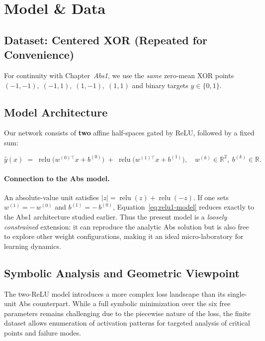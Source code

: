 \section{Model \& Data}
\label{sec:relu1-model-data}

\subsection*{Dataset: Centered XOR (Repeated for Convenience)}
For continuity with Chapter~\textit{Abs1}, we use the \emph{same} zero-mean XOR points \(({-}1,{-}1),\;({-}1,1),\;(1,{-}1),\;(1,1)\) and binary targets \(y\in\{0,1\}\).

\subsection*{Model Architecture}
Our network consists of \textbf{two} affine half-spaces gated by ReLU, followed by a fixed sum:

\begin{equation}
    \hat y(x)
    \;=\;
    \operatorname{relu}\!\bigl(w^{(0)\!\top}x + b^{(0)}\bigr)
    \;+\;
    \operatorname{relu}\!\bigl(w^{(1)\!\top}x + b^{(1)}\bigr),
    \quad
    w^{(k)}\!\in\mathbb{R}^{2},\;
    b^{(k)}\!\in\mathbb{R}.
    \label{eq:relu1-model}
\end{equation}

\paragraph{Connection to the Abs model.}
An absolute-value unit satisfies \(|z|=\operatorname{relu}(z)+\operatorname{relu}(-z).\) If one sets \(w^{(1)}=-\,w^{(0)}\) and \(b^{(1)}=-\,b^{(0)}\), Equation~\eqref{eq:relu1-model} reduces exactly to the Abs1 architecture studied earlier. Thus the present model is a \emph{loosely constrained} extension: it can reproduce the analytic Abs solution but is also free to explore other weight configurations, making it an ideal micro-laboratory for learning dynamics.

\subsection*{Symbolic Analysis and Geometric Viewpoint}
\label{sec:relu1-analysis}

The two-ReLU model introduces a more complex loss landscape than its single-unit Abs counterpart. While a full symbolic minimization over the six free parameters remains challenging due to the piecewise nature of the loss, the finite dataset allows enumeration of activation patterns for targeted analysis of critical points and failure modes.

